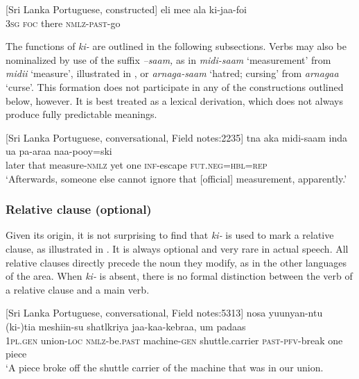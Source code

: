 \ea\label{smith:ex:47}
{}[Sri Lanka Portuguese, constructed]
\gll eli mee ala ki-jaa-foi\\
3\textsc{sg} \textsc{foc} there \textsc{nmlz}-\textsc{past}-go\\
\z

The functions of \textit{ki- }are outlined in the following subsections. Verbs may also be nominalized by use of the suffix \textit{{}--saam, }as in \textit{midi-saam} `measurement' from \textit{midii }`measure', illustrated in , or \textit{arnaga-saam} `hatred; cursing' from \textit{arnagaa} `curse'. This formation does not participate in any of the constructions outlined below, however. It is best treated as a lexical derivation, which does not always produce fully predictable meanings. 

\ea\label{smith:ex:48}
{}[Sri Lanka Portuguese, conversational, Field notes:2235\footnotemark{}]
\gll t{\textopeno}{\textopeno}na aka midi-saam inda u{\ng}a pa-araa naa-pooy=ski\\
later that measure-\textsc{nmlz} yet one \textsc{inf}-escape \textsc{fut}.\textsc{neg}=\textsc{hbl}=\textsc{rep}\\
`Afterwards, someone else cannot ignore that [official] measurement, apparently.'
\z
{}


\subsubsection{Relative clause (optional)}%

Given its origin, it is not surprising to find that \textit{ki- }is used to mark a relative clause, as illustrated in . It is always optional and very rare in actual speech. All relative clauses directly precede the noun they modify, as in the other languages of the area. When \textit{ki- }is absent, there is no formal distinction between the verb of a relative clause and a main verb. 

\ea\label{smith:ex:49}
{}[Sri Lanka Portuguese, conversational, Field notes:5313] 
\gll nosa yuunyan-ntu (ki-)ti{\textltailn}a meshiin-su shatlk{\textepsilon}riya jaa-kaa-kebraa, um padaas\\
1\textsc{pl}.\textsc{gen} union-\textsc{loc} \textsc{nmlz}-be.\textsc{past} machine-\textsc{gen} shuttle.carrier \textsc{past}-\textsc{pfv}-break one piece\\
`A piece broke off the shuttle carrier of the machine that was in our union. 
\z
 
